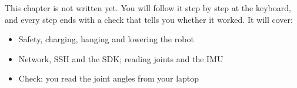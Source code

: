 \label{k:box}
\begin{keyidea}
This chapter is not written yet. You will follow it step by step at the keyboard, and every step ends with a check that tells you whether it worked. It will cover:
\begin{itemize}[nosep]
  \item Safety, charging, hanging and lowering the robot
  \item Network, SSH and the SDK; reading joints and the IMU
  \item Check: you read the joint angles from your laptop
\end{itemize}
\end{keyidea}

